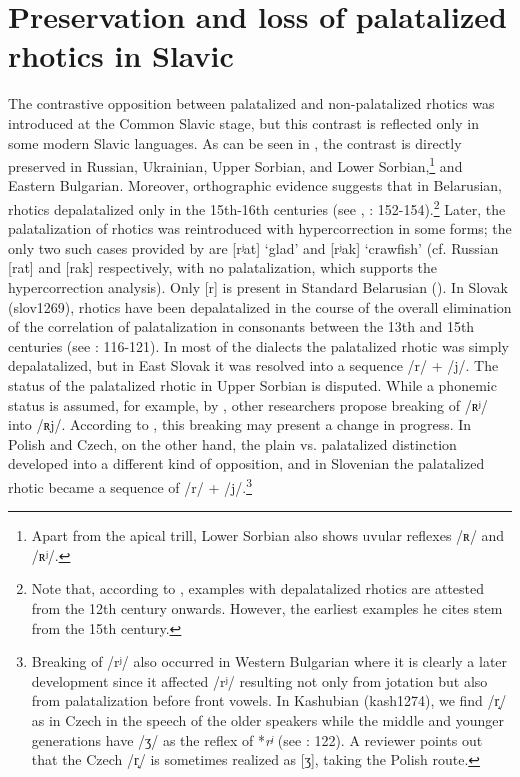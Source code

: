 \documentclass[output=paper]{langscibook}
\begin{document}
\section{Preservation and loss of palatalized rhotics in Slavic}
\label{sec:kavitskaya:4}
The contrastive opposition between palatalized and non-palatalized rhotics was introduced at the Common Slavic stage, but this contrast is reflected only in some modern Slavic languages. As can be seen in , the contrast is directly preserved in Russian, Ukrainian, Upper Sorbian, and Lower Sorbian,\footnote{Apart from the apical trill, Lower Sorbian also shows uvular reflexes /ʀ/ and /ʀʲ/.} and Eastern Bulgarian. Moreover, orthographic evidence suggests that in Belarusian, rhotics depalatalized only in the 15th{}-16th centuries (see \citealt[31--32]{Kalnyn1961}, \citealt{Wexler1977}: 152-154).\footnote{Note that, according to \citet[153--154]{Wexler1977}, examples with depalatalized rhotics are attested from the 12th century onwards. However, the earliest examples he cites stem from the 15th century.} Later, the palatalization of rhotics was reintroduced with hypercorrection in some forms; the only two such cases provided by \citet{Wexler1977} are [rʲat] ‘glad’ and [rʲak] ‘crawfish’ (cf. Russian [rat] and [rak] respectively, with no palatalization, which supports the hypercorrection analysis). Only [r] is present in Standard Belarusian (\citealt{BirdLitvin2020}). In Slovak (slov1269), rhotics have been depalatalized in the course of the overall elimination of the correlation of palatalization in consonants between the 13th and 15th centuries (see \citealt{Krajčovič1975}: 116-121). In most of the dialects the palatalized rhotic was simply depalatalized, but in East Slovak it was resolved into a sequence /r/ + /j/. The status of the palatalized rhotic in Upper Sorbian is disputed. While a phonemic status is assumed, for example, by \citet{Stone1993}, other researchers propose breaking of \mbox{/ʀʲ/} into /ʀj/. According to \citet[300-304]{Jaworski2018}, this breaking may present a change in progress. In Polish and Czech, on the other hand, the plain vs. palatalized distinction developed into a different kind of opposition, and in Slovenian the palatalized rhotic became a sequence of /r/ + /j/.\footnote{Breaking of /rʲ/ also occurred in Western Bulgarian where it is clearly a later development since it affected /rʲ/ resulting not only from jotation but also from palatalization before front vowels. In Kashubian (kash1274), we find /r̝/ as in Czech in the speech of the older speakers while the middle and younger generations have /ʒ/ as the reflex of *\textit{rʲ} (see \citealt{Topolińska1974}: 122). A reviewer points out that the Czech /r̝/ is sometimes realized as [ʒ], taking the Polish route.}
\end{document}

